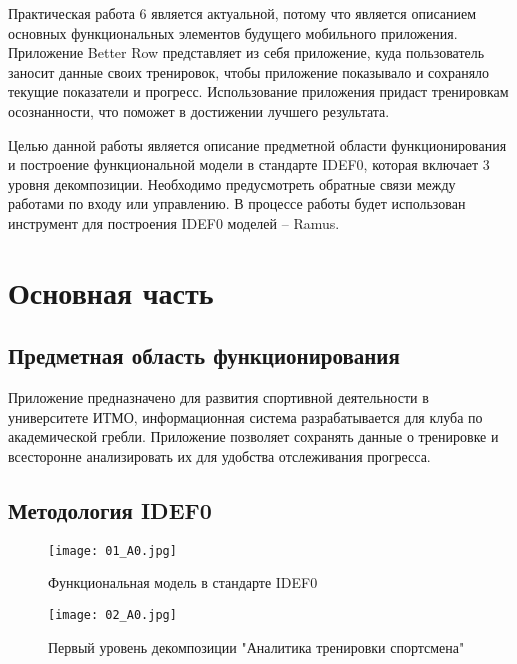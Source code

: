 \documentclass[14pt]{extreport}
\begin{document}
\pagestyle{empty}

\pagestyle{plain}

\tableofcontents

\intro

Практическая работа 6 является актуальной, потому что является описанием основных функциональных элементов будущего мобильного приложения. Приложение Better Row представляет из себя приложение, куда пользователь заносит данные своих тренировок, чтобы приложение показывало и сохраняло текущие показатели и прогресс. Использование приложения придаст тренировкам осознанности, что поможет в достижении лучшего результата.

Целью данной работы является описание предметной области функционирования и построение функциональной модели в стандарте IDEF0, которая включает 3 уровня декомпозиции. Необходимо предусмотреть обратные связи между работами по входу или управлению. В процессе работы будет использован инструмент для построения IDEF0 моделей – Ramus.

\chapter{Основная часть}

\section{Предметная область функционирования}

Приложение предназначено для развития спортивной деятельности в университете ИТМО, информационная система разрабатывается для клуба по академической гребли. Приложение позволяет сохранять данные о тренировке и всесторонне анализировать их для удобства отслеживания прогресса.

\section{Методология IDEF0}

\begin{figure}[H]
\centerline{\texttt{[image: 01\_A0.jpg]}}
\caption{Функциональная модель в стандарте IDEF0}
\label{fig11}
\end{figure}

\begin{figure}[H]
\centerline{\texttt{[image: 02\_A0.jpg]}}
\caption{Первый уровень декомпозиции "Аналитика тренировки спортсмена"}
\label{fig12}
\end{figure}
\end{document}
